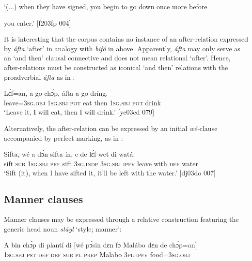 \glt ‘(...) when they have signed, you begin to go down once more before 


\glt you enter.’ [f203fp 004]
\z

It is interesting that the corpus contains no instance of an after-relation expressed by \textit{áfta} ‘after’ in analogy with \textit{bifó} in  above. Apparently, \textit{áfta} may only serve as an ‘and then’ clausal connective and does not mean relational ‘after’. Hence, after-relations must be constructed as iconical ‘and then’ relations with the proadverbial \textit{áfta} as in :


\ea%
    \label{ex:key:1478}
    \gll Lɛ́f=an,    a    go  chɔ́p,  áfta    a    go  dríng.\\
leave=\textsc{3sg.obj}  \textsc{1sg.sbj}  \textsc{pot}  eat    then  \textsc{1sg.sbj}  \textsc{pot}  drink\\

\glt ‘Leave it, I will eat, then I will drink.’ [ye03cd 079]
\z

Alternatively, the after-relation can be expressed by an initial \textit{wé-}clause accompanied by perfect marking, as in :


\ea%
    \label{ex:key:1479}
    \gll Sifta,  wé  a    dɔ́n  sifta    ín,    e    de  lɛ́f    wet    di  watá.\\
sift    \textsc{sub}  \textsc{1sg.sbj}  \textsc{prf}  sift    \textsc{3sg.indp}  \textsc{3sg.sbj}  \textsc{ipfv}  leave  with    \textsc{def}  water\\

\glt ‘Sift (it), when I have sifted it, it’ll be left with the water.’ [dj03do 007]
\z

\subsection{Manner clauses}\label{sec:10.7.4}

Manner clauses may be expressed through a relative construction featuring the generic head noun \textit{stáyl} ‘style; manner’:


\ea%
    \label{ex:key:1480}
    \gll \MakeUppercase{A}   bin  chɔ́p  di  plantí  di    [wé  pɔ́sin  dɛn
fɔ  Malábo  dɛn  de  chɔ́p=an]\\
\textsc{1sg.sbj} \textsc{pst}  \textsc{def}  \textsc{def}  \textsc{sub}  \textsc{pl} 
\textsc{prep}  Malabo  \textsc{3pl}  \textsc{ipfv}  food=\textsc{3sg.obj}\\

